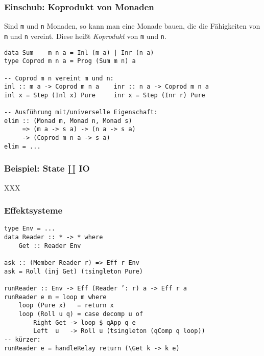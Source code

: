 \documentclass[12pt,compress,ngerman,utf8,t]{beamer}
\begin{document}
\begin{frame}[fragile]\frametitle{Einschub: Koprodukt von Monaden}
  Sind \texttt{m} und \texttt{n} Monaden, so kann man eine Monade bauen, die
  die Fähigkeiten von \texttt{m} und \texttt{n} vereint. Diese heißt
  \emph{Koprodukt} von \texttt{m} und \texttt{n}.
  \medskip

  \small
  \begin{verbatim}
data Sum    m n a = Inl (m a) | Inr (n a)
type Coprod m n a = Prog (Sum m n) a

-- Coprod m n vereint m und n:
inl :: m a -> Coprod m n a    inr :: n a -> Coprod m n a
inl x = Step (Inl x) Pure     inr x = Step (Inr r) Pure

-- Ausführung mit/universelle Eigenschaft:
elim :: (Monad m, Monad n, Monad s)
     => (m a -> s a) -> (n a -> s a)
     -> (Coprod m n a -> s a)
elim = ...
  \end{verbatim}
\end{frame}

\begin{frame}[fragile]\frametitle{Beispiel: State $\amalg$ IO}
  XXX
\end{frame}

\begin{frame}[fragile]\frametitle{Effektsysteme}
  \begin{verbatim}
type Env = ...
data Reader :: * -> * where
    Get :: Reader Env

ask :: (Member Reader r) => Eff r Env
ask = Roll (inj Get) (tsingleton Pure)

runReader :: Env -> Eff (Reader ’: r) a -> Eff r a
runReader e m = loop m where
    loop (Pure x)   = return x
    loop (Roll u q) = case decomp u of
        Right Get -> loop $ qApp q e
        Left  u   -> Roll u (tsingleton (qComp q loop))
-- kürzer:
runReader e = handleRelay return (\Get k -> k e)
  \end{verbatim}
\end{frame}
\end{document}
